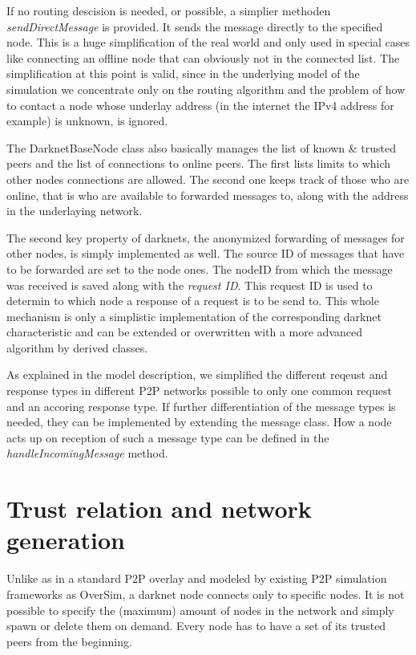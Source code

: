 If no routing descision is needed, or possible, a simplier methoden \emph{sendDirectMessage} is provided. It sends the message directly to the specified node. This is a huge simplification of the real world and only used in special cases like connecting an offline node that can obviously not in the connected list. The simplification at this point is valid, since in the underlying model of the simulation we concentrate only on the routing algorithm and the problem of how to contact a node whose underlay address (in the internet the IPv4 address for example) is unknown, is ignored.

The DarknetBaseNode class also basically manages the list of known & trusted peers and the list of connections to online peers. The first lists limits to which other nodes connections are allowed. The second one keeps track of those who are online, that is who are available to forwarded messages to, along with the address in the underlaying network.

The second key property of darknets, the anonymized forwarding of messages for other nodes, is simply implemented as well. The source ID of messages that have to be forwarded are set to the node ones. The nodeID from which the message was received is saved along with the \emph{request ID}. This request ID is used to determin to which node a response of a request is to be send to. This whole mechanism is only a simplistic implementation of the corresponding darknet characteristic and can be extended or overwritten with a more advanced algorithm by derived classes.

As explained in the model description, we simplified the different reqeust and response types in different P2P networks possible to only one common request and an accoring response type. If further differentiation of the message types is needed, they can be implemented by extending the message class. How a node acts up on reception of such a message type can be defined in the \emph{handleIncomingMessage} method.

\section{Trust relation and network generation}

Unlike as in a standard P2P overlay and modeled by existing P2P simulation frameworks as OverSim, a darknet node connects only to specific nodes. It is not possible to specify the (maximum) amount of nodes in the network and simply spawn or delete them on demand. Every node has to have a set of its trusted peers from the beginning.


